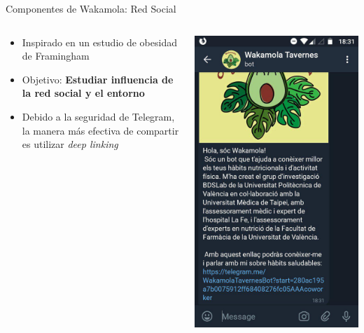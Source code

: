 \documentclass[bigger]{beamer}
\begin{document}
\begin{frame}{Componentes de Wakamola: Red Social}
\begin{columns}[T]
	\begin{column}[T]{6cm}
		\centering
		\vspace{0.2cm}
		\begin{itemize}
			\item Inspirado en un estudio de obesidad de Framingham
			\item Objetivo: \textbf{Estudiar influencia de la red social y el entorno}
			\item Debido a la seguridad de Telegram, la manera más efectiva de compartir es utilizar \textit{deep linking} 
		\end{itemize}
	\end{column}
	\begin{column}[T]{6cm}
		\centering
		\includegraphics[scale=0.16]{img/social}
	\end{column}
\end{columns}
\end{frame}
\end{document}
